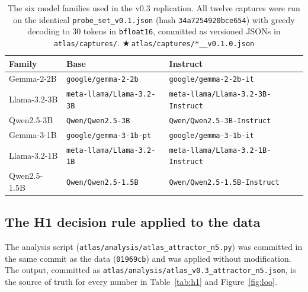 \documentclass[11pt,letterpaper]{article}
\newcommand{\repro}[1]{%
  \textcolor{fathomgreen}{\footnotesize$\bigstar$\,\texttt{#1}}}
\begin{document}
\begin{table}[h]
\centering
\small
\begin{tabular}{lll}
\toprule
Family & Base & Instruct \\
\midrule
Gemma-2-2B  & \texttt{google/gemma-2-2b}    & \texttt{google/gemma-2-2b-it} \\
Llama-3.2-3B & \texttt{meta-llama/Llama-3.2-3B} & \texttt{meta-llama/Llama-3.2-3B-Instruct} \\
Qwen2.5-3B  & \texttt{Qwen/Qwen2.5-3B}      & \texttt{Qwen/Qwen2.5-3B-Instruct} \\
\midrule
Gemma-3-1B  & \texttt{google/gemma-3-1b-pt} & \texttt{google/gemma-3-1b-it} \\
Llama-3.2-1B & \texttt{meta-llama/Llama-3.2-1B} & \texttt{meta-llama/Llama-3.2-1B-Instruct} \\
Qwen2.5-1.5B & \texttt{Qwen/Qwen2.5-1.5B}   & \texttt{Qwen/Qwen2.5-1.5B-Instruct} \\
\bottomrule
\end{tabular}
\caption{The six model families used in the v0.3 replication. All twelve
captures were run on the identical \texttt{probe\_set\_v0.1.json} (hash
\texttt{34a7254920bce654}) with greedy decoding to 30 tokens in
\texttt{bfloat16}, committed as versioned JSONs in
\texttt{atlas/captures/}.
\repro{atlas/captures/*\_\_v0.1.0.json}}
\label{tab:families}
\end{table}

\subsection{The H1 decision rule applied to the data}

The analysis script (\texttt{atlas/analysis/atlas\_attractor\_n5.py}) was
committed in the same commit as the data (\texttt{01969cb}) and was applied
without modification. The output, committed as
\texttt{atlas/analysis/atlas\_v0.3\_attractor\_n5.json}, is the source of
truth for every number in Table~\ref{tab:h1} and Figure~\ref{fig:loo}.
\end{document}
